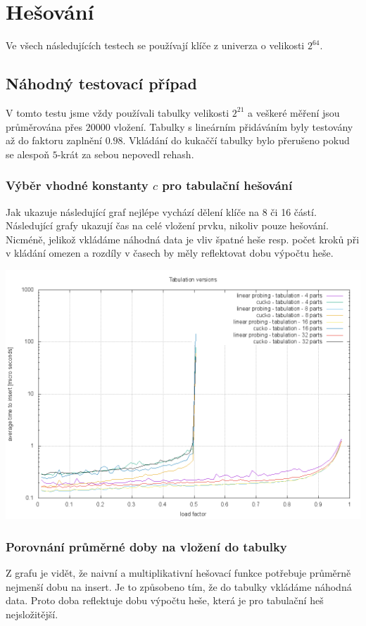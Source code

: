 \documentclass[12pt,a4paper]{report}
\begin{document}
\chapter*{Hešování}
Ve všech následujících testech se používají klíče z univerza o velikosti $2^{64}$.

\section*{Náhodný testovací případ}
V tomto testu jsme vždy používali tabulky velikosti $2^{21}$ a veškeré měření jsou 
průměrována přes $20000$ vložení. Tabulky s lineárním přidáváním
byly testovány až do faktoru zaplnění $0.98$. Vkládání do kukaččí tabulky bylo přerušeno
pokud se alespoň $5$-krát za sebou nepovedl rehash.

\subsection*{Výběr vhodné konstanty $c$ pro tabulační hešování}
Jak ukazuje následující graf nejlépe vychází dělení klíče na 8 či 16 částí. 
Následující grafy ukazují čas na celé vložení prvku, nikoliv pouze hešování.
Nicméně, jelikož vkládáme náhodná data je vliv špatné heše resp. počet kroků při v kládání 
omezen a rozdíly v časech by měly reflektovat dobu výpočtu heše.

\includegraphics[width=\textwidth]{./tests/time_test/tabulation-hash-test.png}


\subsection*{Porovnání průměrné doby na vložení do tabulky}
Z grafu je vidět, že naivní a multiplikativní hešovací funkce potřebuje 
průměrně nejmenší dobu na insert. Je to způsobeno tím, že do tabulky vkládáme 
náhodná data. Proto doba reflektuje dobu výpočtu heše, která je pro tabulační heš nejsložitější.
\end{document}
